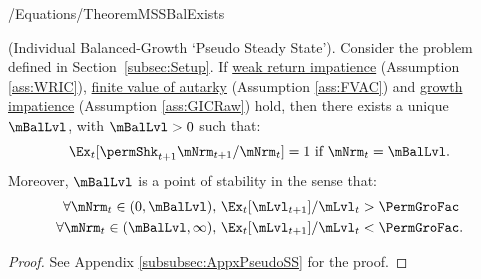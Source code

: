 \documentclass[BufferStockTheory]{subfiles}
\begin{document}
\begin{verbatimwrite}{\econtexRoot/Equations/TheoremMSSBalExists}
  \begin{theorem}(Individual Balanced-Growth `Pseudo Steady State').
    Consider the problem defined in Section~\ref{subsec:Setup}.
If \hyperlink{WRIC}{weak return impatience} (Assumption \ref{ass:WRIC}), \hyperlink{FVAC}{finite value of autarky} (Assumption \ref{ass:FVAC}) and \hyperlink{GIC}{growth impatience} (Assumption \ref{ass:GICRaw}) hold, then there exists a unique $\mBalLvl$, with $\mBalLvl>0$ such that:
    \begin{equation}
      \Ex_t [\permShk_{t+1}{\mNrm}_{t+1}/\mNrm_t] = 1 \mbox{~if~} \mNrm_t = \mBalLvl.
      \label{eq:mBalLvl}
    \end{equation}
    Moreover, $\mBalLvl$ is a point of stability in the sense that:
    \begin{equation}
      \label{eq:stabilityStE}
      \begin{aligned}
        \forall {\mNrm}_t\in(0,\mBalLvl),      \,\,& \Ex_{t}[\mLvl_{t+1}]/\mLvl_{t} > \PermGroFac \\
        \forall {\mNrm}_t\in(\mBalLvl,\infty), \,\,& \Ex_{t}[\mLvl_{t+1}]/\mLvl_{t} < \PermGroFac.
      \end{aligned}
    \end{equation}
  \end{theorem}
\end{verbatimwrite} \unskip

\begin{proof}
See Appendix \ref{subsubsec:AppxPseudoSS} for the proof.

\end{proof}
\end{document}
